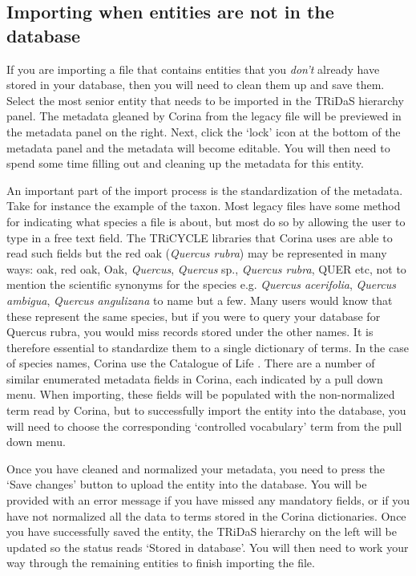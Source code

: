 \subsection{Importing when entities are not in the database}
If you are importing a file that contains entities that you \emph{don't} already have stored in your database, then you will need to clean them up and save them.   Select the most senior entity that needs to be imported in the TRiDaS hierarchy panel.  The metadata gleaned by Corina from the legacy file will be previewed in the metadata panel on the right.  Next, click the `lock' icon at the bottom of the metadata panel and the metadata will become editable.  You will then need to spend some time filling out and cleaning up the metadata for this entity.  

An important part of the import process is the standardization of the metadata.  Take for instance the example of the taxon.  Most legacy files have some method for indicating what species a file is about, but most do so by allowing the user to type in a free text field.  The TRiCYCLE libraries that Corina uses are able to read such fields but the red oak (\textit{Quercus rubra}) may be represented in many ways: oak, red oak, Oak, \textit{Quercus}, \textit{Quercus} sp., \textit{Quercus rubra}, QUER etc, not to mention the scientific synonyms for the species e.g. \textit{Quercus acerifolia}, \textit{Quercus ambigua}, \textit{Quercus angulizana} to name but a few.  Many users would know that these represent the same species, but if you were to query your database for Quercus rubra, you would miss records stored under the other names.  It is therefore essential to standardize them to a single dictionary of terms.  In the case of species names, Corina use the Catalogue of Life \citep{col}.  There are a number of similar enumerated metadata fields in Corina, each indicated by a pull down menu.  When importing, these fields will be populated with the non-normalized term read by Corina, but to successfully import the entity into the database, you will need to choose the corresponding `controlled vocabulary' term from the pull down menu.  

Once you have cleaned and normalized your metadata, you need to press the `Save changes' button to upload the entity into the database.  You will be provided with an error message if you have missed any mandatory fields, or if you have not normalized all the data to terms stored in the Corina dictionaries.  Once you have successfully saved the entity, the TRiDaS hierarchy on the left will be updated so the status reads `Stored in database'.  You will then need to work your way through the remaining entities to finish importing the file.

